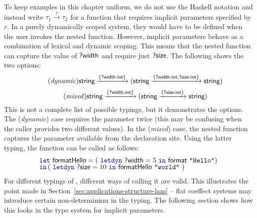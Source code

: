 To keep examples in this chapter uniform, we do not use the Haskell notation and instead
write $\tau_1 \xrightarrow{r} \tau_2$ for a function that requires implicit parameters specified by $r$.
In a purely dynamically scoped system, they would have to be defined when the user invokes the nested function.
However, implicit parameters behave as a combination of lexical and dynamic scoping. This means
that the nested function can capture the value of $\textnormal{\sffamily ?width}$ and require just $\textnormal{\sffamily ?size}$.
The following shows the two options:
%
\begin{equation}
\tag{\emph{dynamic}}
\ident{string} \xrightarrow{ \{ \ident{?width} : \ident{int} \} }
  (\ident{string} \xrightarrow{ \{ \ident{?width} : \ident{int}, \ident{?size} : \ident{int} \} } \ident{string})
\end{equation}
\vspace{-1em}
\begin{equation}
\tag{\emph{mixed}}
\ident{string} \xrightarrow{ \{ \ident{?width} : \ident{int} \} }
  (\ident{string} \xrightarrow{ \{ \ident{?size} : \ident{int} \} } \ident{string})
\end{equation}
%
This is not a complete list of possible typings, but it demonstrates the options. The (\emph{dynamic})
case requires the parameter  twice (this may be confusing when the caller provides
two different values). In the (\emph{mixed}) case, the nested function captures the  
parameter available from the declaration site. Using the latter typing, the function can be called as follows:\
%
\begin{equation*}
\begin{array}{l}
\kvd{let}~\ident{formatHello} = (~\kvd{letdyn}~\ident{?width}=5~\kvd{in}~\ident{format}~\texttt{"Hello"})\\[-0.25em]
\kvd{in}\,(~\kvd{letdyn}~\ident{?size} = 10~\kvd{in}~\ident{formatHello}~\texttt{"world"}~)
\end{array}
\end{equation*}
%
For different typings of , different ways of calling it are valid. This illustrates
the point made in Section~\ref{sec:applications-structure-lam} -- flat coeffect systems may 
introduce certain non-determinism in the typing. The following section shows how this looks in the
type system for implicit parameters.


